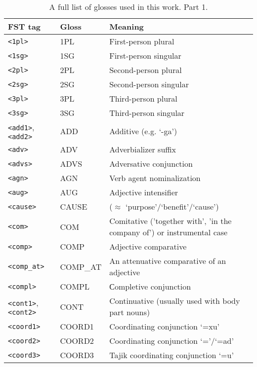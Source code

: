 \begin{table}[!h]
    \begin{center}
        \caption{A full list of glosses used in this work. Part 1.}
        \label{Tab:glosses_1}
        \begin{tabular}{|p{4cm}|p{3cm}|p{8.5cm}|}
            \hline
            \textbf{FST tag} & \textbf{Gloss} & \textbf{Meaning} \\
            \hline
            \hline
            \texttt{<1pl>} & 1PL & First-person plural\\
            \texttt{<1sg>} & 1SG & First-person singular\\
            \texttt{<2pl>} & 2PL & Second-person plural\\
            \texttt{<2sg>} & 2SG & Second-person singular\\
            \texttt{<3pl>} & 3PL & Third-person plural\\
            \texttt{<3sg>} & 3SG & Third-person singular\\
            \texttt{<add1>}, \texttt{<add2>} & ADD & Additive (e.g. `-ga')\\
            \texttt{<adv>} & ADV & Adverbializer suffix\\
            \texttt{<advs>} & ADVS & Adversative conjunction\\
            \texttt{<agn>} & AGN & Verb agent nominalization\\
            \texttt{<aug>} & AUG & Adjective intensifier\\
            \texttt{<cause>} & CAUSE & ($\approx$ `purpose'/`benefit'/`cause')\\
            \texttt{<com>} & COM & Comitative ('together with', 'in the company of') or instrumental case\\
            \texttt{<comp>} & COMP & Adjective comparative\\
            \texttt{<comp\_at>} & COMP\_AT & An attenuative comparative of an adjective\\
            \texttt{<compl>} & COMPL & Сompletive conjunction\\
            \texttt{<cont1>}, \texttt{<cont2>} & CONT & Continuative (usually used with body part nouns)\\
            \texttt{<coord1>} & COORD1 & Coordinating conjunction `=xu'\\
            \texttt{<coord2>} & COORD2 & Coordinating conjunction `='/`=ad'\\
            \texttt{<coord3>} & COORD3 & Tajik coordinating conjunction `=u'\\

\end{tabular}
\end{center}
\end{table}
